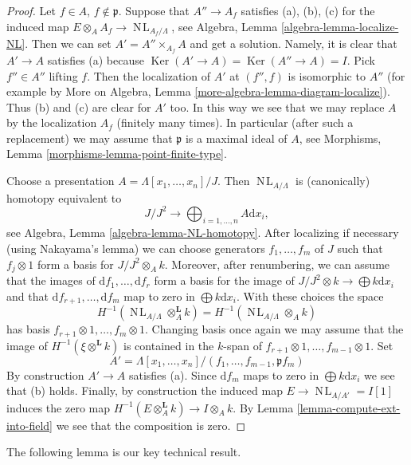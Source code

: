 \documentclass{stacks-project}
\theoremstyle{plain}
\theoremstyle{definition}
\theoremstyle{remark}
\numberwithin{equation}{subsection}
\def\NL{\mathop{N\!L}\nolimits}
\def\Ker{\mathop{\mathrm{Ker}}}
\begin{document}
\begin{proof}
Let $f \in A$, $f \not \in \mathfrak p$. Suppose that $A'' \to A_f$
satisfies (a), (b), (c) for the induced map
$E \otimes_A A_f \to \NL_{A_f/\Lambda}$, see
Algebra, Lemma \ref{algebra-lemma-localize-NL}.
Then we can set $A' = A'' \times_{A_f} A$ and get a solution.
Namely, it is clear that $A' \to A$ satisfies (a) because
$\Ker(A' \to A) = \Ker(A'' \to A) = I$. Pick
$f'' \in A''$ lifting $f$. Then the localization of $A'$ at
$(f'', f)$ is isomorphic to $A''$
(for example by
More on Algebra, Lemma \ref{more-algebra-lemma-diagram-localize}).
Thus (b) and (c) are clear for $A'$ too.
In this way we see that we may replace $A$ by the localization
$A_f$ (finitely many times).
In particular (after such a replacement) we may assume that $\mathfrak p$
is a maximal ideal of $A$, see
Morphisms, Lemma \ref{morphisms-lemma-point-finite-type}.

\medskip\noindent
Choose a presentation $A = \Lambda[x_1, \ldots, x_n]/J$. Then
$\NL_{A/\Lambda}$ is (canonically) homotopy equivalent to
$$
J/J^2
\longrightarrow
\bigoplus\nolimits_{i = 1, \ldots, n} A\text{d}x_i,
$$
see Algebra, Lemma \ref{algebra-lemma-NL-homotopy}. After localizing
if necessary (using Nakayama's lemma) we can choose generators
$f_1, \ldots, f_m$ of $J$ such that $f_j \otimes 1$ form a basis for
$J/J^2 \otimes_A k$. Moreover, after renumbering, we can assume that the
images of $\text{d}f_1, \ldots, \text{d}f_r$ form a
basis for the image of $J/J^2 \otimes k \to \bigoplus k\text{d}x_i$
and that $\text{d}f_{r + 1}, \ldots, \text{d}f_m$ map to zero in
$\bigoplus k\text{d}x_i$. With these choices the space
$$
H^{-1}(\NL_{A/\Lambda} \otimes^{\mathbf{L}}_A k) =
H^{-1}(\NL_{A/\Lambda} \otimes_A k)
$$
has basis $f_{r + 1} \otimes 1, \ldots, f_m \otimes 1$. Changing basis
once again we may assume that the image of $H^{-1}(\xi \otimes^{\mathbf{L}} k)$
is contained in the $k$-span of
$f_{r + 1} \otimes 1, \ldots, f_{m - 1} \otimes 1$.
Set
$$
A' = \Lambda[x_1, \ldots, x_n]/(f_1, \ldots, f_{m - 1}, \mathfrak pf_m)
$$
By construction $A' \to A$ satisfies (a). Since $\text{d}f_m$ maps
to zero in $\bigoplus k\text{d}x_i$ we see that (b) holds. Finally, by
construction the induced map $E \to \NL_{A/A'} = I[1]$ induces the zero map
$H^{-1}(E \otimes_A^\mathbf{L} k) \to I \otimes_A k$. By
Lemma \ref{lemma-compute-ext-into-field}
we see that the composition is zero.
\end{proof}

\noindent
The following lemma is our key technical result.
\end{document}
